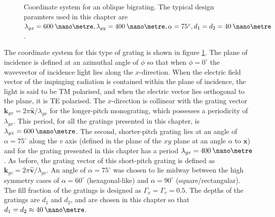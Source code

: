\begin{figure}
\begin{center}

\caption[Coordinate system for an oblique bigrating.]{Coordinate system for an oblique bigrating. The typical design paramters used in this chapter are $\lambda_{gx}=600\:\nano\metre, \lambda_{gy}=400\:\nano\metre, \alpha=75^\circ, d_1=d_2=40\:\nano\metre$.\label{fig:obl-coords}}
\end{center}
\end{figure}

The coordinate system for this type of grating is shown in figure \ref{fig:obl-coords}. The plane of incidence is defined at an azimuthal angle of $\phi$ so that when $\phi=0^\circ$ the wavevector of incidence light lies along the $x$-direction. When the electric field vector of the impinging radiation is contained within the plane of incidence, the light is said to be TM polarised, and when the electric vector lies orthogonal to the plane, it is TE polarised. The $x$-direction is collinear with the grating vector $\mathbf{k}_{gx}=2\pi\hat{\mathbf{x}}/\lambda_{gx}$ for the longer-pitch monograting, which possesses a periodicity of $\lambda_{gx}$. This period, for all the gratings presented in this chapter, is $\lambda_{gx}=600\:\nano\metre$. The second, shorter-pitch grating lies at an angle of $\alpha=75^\circ$ along the $v$ axis (defined in the plane of the $xy$ plane at an angle $\alpha$ to $\hat{\mathbf{x}}$) and for the grating presented in this chapter has a period $\lambda_{gv}=400\:\nano\metre$. As before, the grating vector of this short-pitch grating is defined as $\mathbf{k}_{gv}=2\pi\hat{\mathbf{v}}/\lambda_{gv}$. An angle of $\alpha=75^\circ$ was chosen to lie midway between the high symmetry cases of $\alpha=60^\circ$ (hexagonal-like) and $\alpha=90^\circ$ (square/rectangular). The fill fraction of the gratings is designed as $\Gamma_x=\Gamma_v=0.5$. The depths of the gratings are $d_1$ and $d_2$, and are chosen in this chapter so that $d_1 = d_2 \approx 40\:\nano\metre$.

